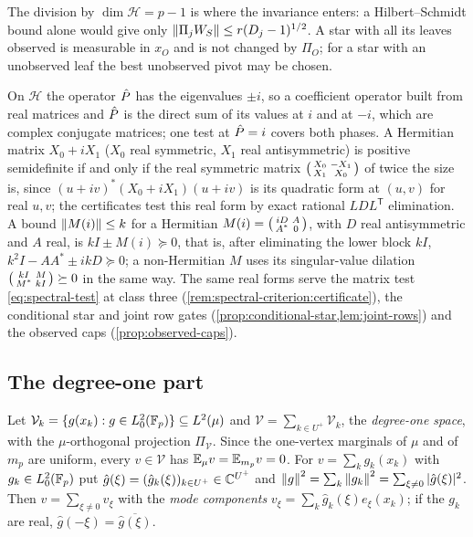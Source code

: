 The division by $\dim\mathcal H=p-1$ is where the invariance enters: a
Hilbert--Schmidt bound alone would give only $\left\|\Pi_jW_S\right\|\le r(D_j-1)^{1/2}$. A
star with all its leaves observed is measurable in $x_O$ and is not changed by
$\Pi_O$; for a star with an unobserved leaf the best unobserved pivot may be chosen.

\begin{remark}\label{rem:realified-gates}
On $\mathcal H$ the operator $\hat P$ has the eigenvalues $\pm i$, so a coefficient
operator built from real matrices and $\hat P$ is the direct sum of its values at $i$
and at $-i$, which are complex conjugate matrices; one test at $\hat P=i$ covers both
phases. A Hermitian matrix $X_0+iX_1$ ($X_0$ real symmetric, $X_1$ real
antisymmetric) is positive semidefinite if and only if the real symmetric matrix
$\begin{psmallmatrix}X_0&-X_1\\X_1&X_0\end{psmallmatrix}$ of twice the size is, since
$(u+iv)^*(X_0+iX_1)(u+iv)$ is its quadratic form at $(u,v)$ for real $u,v$; the
certificates test this real form by exact rational $LDL^{\mathsf T}$ elimination. A
bound $\left\|M(i)\right\|\le k$ for a Hermitian $M(i)=\begin{psmallmatrix}iD&A\\A^*&0\end{psmallmatrix}$,
with $D$ real antisymmetric and $A$ real, is $kI\pm M(i)\succeq0$, that is, after
eliminating the lower block $kI$, $k^2I-AA^*\pm ikD\succeq0$; a non-Hermitian $M$ uses
its singular-value dilation
$\begin{psmallmatrix}kI&M\\M^*&kI\end{psmallmatrix}\succeq0$ in the same way. The same
real forms serve the matrix test \eqref{eq:spectral-test} at class three
(\cref{rem:spectral-criterion:certificate}), the conditional star and joint row
gates (\cref{prop:conditional-star,lem:joint-rows}) and the observed caps
(\cref{prop:observed-caps}).
\end{remark}

\subsection{The degree-one part}\label{subsec:spec:degone}

Let $\mathcal V_k=\{g(x_k):g\in L^2_0(\mathbb F_p)\}\subseteq L^2(\mu)$ and
$\mathcal V=\sum_{k\in U^+}\mathcal V_k$, the \emph{degree-one space}, with the
$\mu$-orthogonal projection $\Pi_{\mathcal V}$. Since the one-vertex marginals of
$\mu$ and of $m_p$ are uniform, every $v\in\mathcal V$ has
$\mathbb E_\mu v=\mathbb E_{m_p}v=0$. For $v=\sum_kg_k(x_k)$ with $g_k\in L^2_0(\mathbb F_p)$ put
$\hat g(\xi)=(\hat g_k(\xi))_{k\in U^+}\in\mathbb C^{U^+}$ and
$\left\|g\right\|^2=\sum_k\left\|g_k\right\|^2=\sum_{\xi\ne0}|\hat g(\xi)|^2$. Then
$v=\sum_{\xi\ne0}v_\xi$ with the \emph{mode components}
$v_\xi=\sum_k\hat g_k(\xi)e_\xi(x_k)$; if the $g_k$ are real,
$\hat g(-\xi)=\overline{\hat g(\xi)}$.

